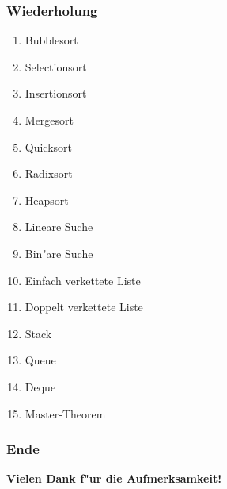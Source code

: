 \documentclass{beamer}
\begin{document}
\begin{frame}
\frametitle{Wiederholung}
\begin{enumerate}
\item Bubblesort
\item Selectionsort
\item Insertionsort
\item Mergesort
\item Quicksort
\item Radixsort
\item Heapsort
\item Lineare Suche
\item Bin"are Suche
\item Einfach verkettete Liste
\item Doppelt verkettete Liste
\item Stack
\item Queue
\item Deque
\item Master-Theorem
\end{enumerate}
\end{frame}


\begin{frame}
\frametitle{Ende}
\begin{center}
\textbf{\Huge Vielen Dank f"ur die Aufmerksamkeit!}
\end{center}
\end{frame}
\end{document}
